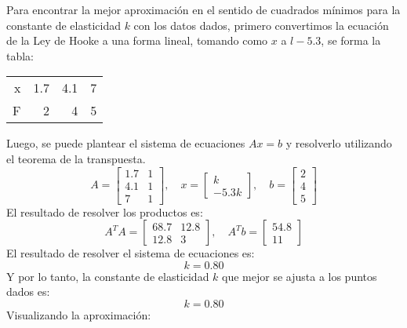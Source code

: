 \documentclass{article}
\begin{document}
Para encontrar la mejor aproximación en el sentido de cuadrados mínimos para la constante de elasticidad \( k \) con los datos dados, primero convertimos la ecuación de la Ley de Hooke a una forma lineal, tomando como $x$ a $l-5.3$, se forma la tabla:
\begin{center}
    \begin{tabular}{||r||r|r|r||}
    \hline
    x & 1.7 & 4.1 & 7 \\
    F & 2 & 4 & 5 \\
    \hline
    \end{tabular}
\end{center}
Luego, se puede plantear el sistema de ecuaciones \( Ax = b \) y resolverlo utilizando el teorema de la transpuesta.
\begin{equation}
    A = \begin{bmatrix}
        1.7 & 1 \\
        4.1 & 1 \\
        7 & 1
    \end{bmatrix}, \quad x = \begin{bmatrix}
        k \\
        -5.3k
    \end{bmatrix}, \quad b = \begin{bmatrix}
        2 \\
        4 \\
        5
    \end{bmatrix}
\end{equation}
El resultado de resolver los productos es:
\begin{equation}
    A^TA = \begin{bmatrix}
        68.7 & 12.8 \\
        12.8 & 3
    \end{bmatrix}, \quad A^Tb = \begin{bmatrix}
        54.8 \\
        11
    \end{bmatrix}
\end{equation}
El resultado de resolver el sistema de ecuaciones es:
\begin{equation}
    k = 0.80
\end{equation}
Y por lo tanto, la constante de elasticidad \( k \) que mejor se ajusta a los puntos dados es:
\begin{equation}
    k = 0.80
\end{equation}
Visualizando la aproximación:
\end{document}
